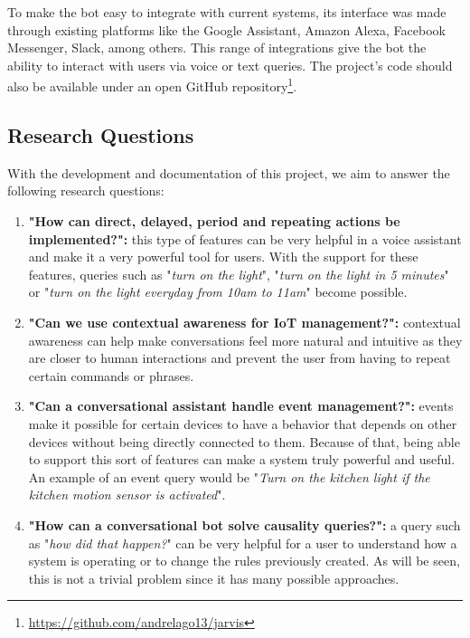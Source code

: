 \documentclass[runningheads]{llncs}
\begin{document}
To make the bot easy to integrate with current systems, its interface was made through existing platforms like the Google Assistant, Amazon Alexa, Facebook Messenger, Slack, among others. This range of integrations give the bot the ability to interact with users via voice or text queries. The project's code should also be available under an open GitHub repository\footnote{\url{https://github.com/andrelago13/jarvis}}.

\subsection{Research Questions}

With the development and documentation of this project, we aim to answer the following research questions:

\begin{enumerate}
    \item \textbf{"How can direct, delayed, period and repeating actions be implemented?":} this type of features can be very helpful in a voice assistant and make it a very powerful tool for users. With the support for these features, queries such as "\textit{turn on the light}", "\textit{turn on the light in 5 minutes}" or "\textit{turn on the light everyday from 10am to 11am}" become possible.

    \item \textbf{"Can we use contextual awareness for IoT management?":} contextual awareness can help make conversations feel more natural and intuitive as they are closer to human interactions and prevent the user from having to repeat certain commands or phrases. 
    
    \item \textbf{"Can a conversational assistant handle event management?":} events make it possible for certain devices to have a behavior that depends on other devices without being directly connected to them. Because of that, being able to support this sort of features can make a system truly powerful and useful. An example of an event query would be "\textit{Turn on the kitchen light if the kitchen motion sensor is activated}".
    
    \item \textbf{"How can a conversational bot solve causality queries?":} a query such as "\textit{how did that happen?}" can be very helpful for a user to understand how a system is operating or to change the rules previously created. As will be seen, this is not a trivial problem since it has many possible approaches.
\end{enumerate}
\end{document}
